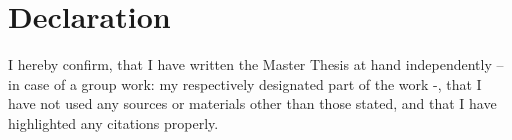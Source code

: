 \section*{Declaration}
I hereby confirm, that I have written the Master Thesis at hand independently – in case of a group work: my respectively designated part of the work -, that I have not used any sources or materials other than those stated, and that I have highlighted any citations properly.

\newpage